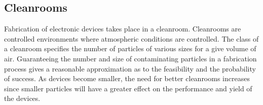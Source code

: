 \subsection{Cleanrooms}
\label{sec:fab:cleanrooms}

%
%
%
%

Fabrication of electronic devices takes place in a cleanroom. Cleanrooms are controlled environments where atmospheric conditions are controlled. The class of a cleanroom specifies the number of particles of various sizes for a give volume of air. Guaranteeing the number and size of contaminating particles in a fabrication process gives a reasonable approximation as to the feasibility and the probability of success. As devices become smaller, the need for better cleanrooms increases since smaller particles will have a greater effect on the performance and yield of the devices.
